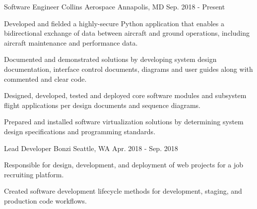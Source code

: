

\begin{cventries}

  \cventry
    {Software Engineer} %
    {Collins Aerospace} %
    {Annapolis, MD} %
    {Sep. 2018 - Present} %
    {
      \begin{cvitems} %
        \item {Developed and fielded a highly-secure Python application that enables a bidirectional exchange of data between aircraft and ground operations, including aircraft maintenance and performance data.}
        \item {Documented and demonstrated solutions by developing system design documentation, interface control documents, diagrams and user guides along with commented and clear code.}
        \item {Designed, developed, tested and deployed core software modules and subsystem flight applications per design documents and sequence diagrams.}
        \item {Prepared and installed software virtualization solutions by determining system design specifications and programming standards.}
      \end{cvitems}
    }

  \cventry
    {Lead Developer} %
    {Bonzi} %
    {Seattle, WA} %
    {Apr. 2018 - Sep. 2018} %
    {
      \begin{cvitems} %
        \item {Responsible for design, development, and deployment of web projects for a job recruiting platform.}
        \item {Created software development lifecycle methods for development, staging, and production code workflows.}
      \end{cvitems}
    }


\end{cventries}

